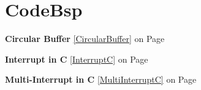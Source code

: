 \section{CodeBsp}
\textbf{Circular Buffer } \ref{CircularBuffer} on Page \pageref{CircularBuffer}

\clearpage

\textbf{Interrupt in C } \ref{InterruptC} on Page \pageref{InterruptC}


\textbf{Multi-Interrupt in C } \ref{MultiInterruptC} on Page \pageref{MultiInterruptC}

